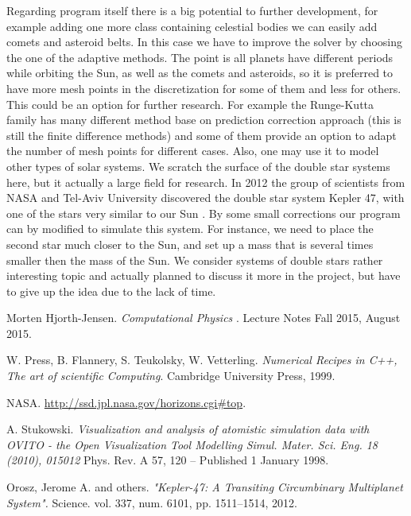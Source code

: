 \documentclass[10pt]{article}
\begin{document}
Regarding program itself there is a big potential to further development, for example adding one more class containing celestial bodies we can easily add comets and asteroid belts.
In this case we have to improve the solver by choosing the one of the adaptive methods. The point is all planets have different periods while orbiting the Sun, as well as the comets and asteroids,  so it is preferred to have more mesh points in the discretization for some of them and less for others. This could be an option for further research. For example the Runge-Kutta family has many different method base on prediction correction approach (this is still the finite difference methods) and some of them provide an option to adapt the number of mesh points for different cases.
 Also, one may use it to model other types of solar systems. We scratch the surface of the double star systems here, but it actually a large field for research. In 2012 the group of scientists from NASA and Tel-Aviv University discovered the double star system Kepler 47, with one of the stars very similar to our Sun \cite{kepler}. By some small corrections our program can by modified to simulate this system. For instance, we need to place the second star much closer to the Sun, and set up a mass that is several times smaller then the mass of the Sun. We consider systems of double stars rather interesting topic and actually planned to discuss it more in the project, but have to give up the idea due to the lack of time.

\newpage
\begin{thebibliography}{2}
Morten Hjorth-Jensen. 
\textit{Computational Physics
}. 
Lecture Notes Fall 2015, August 2015.

W. Press, B. Flannery, S. Teukolsky, W. Vetterling. 
\textit{Numerical Recipes in C++, The art of scientific Computing}. 
Cambridge University Press, 1999.

NASA.
\url{http://ssd.jpl.nasa.gov/horizons.cgi#top}.


A. Stukowski.
\textit{
Visualization and analysis of atomistic simulation data with OVITO - the Open Visualization Tool
Modelling Simul. Mater. Sci. Eng. 18 (2010), 015012}
Phys. Rev. A 57, 120 – Published 1 January 1998.

Orosz, Jerome A. and others.
\textit
{"Kepler-47: A Transiting Circumbinary Multiplanet System". 
}
Science. vol. 337, num. 6101, pp. 1511--1514, 2012. 
 
\end{thebibliography}
\end{document}
